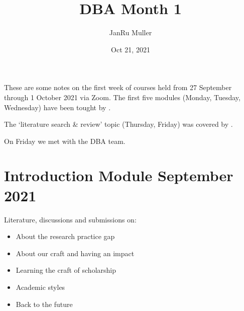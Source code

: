 \documentclass[letterpaper,10pt,english]{jupyterBook}
\title{DBA Month 1}
\date{Oct 21, 2021}
\author{Jan\sphinxhyphen{}Ru Muller}
\begin{document}
\pagestyle{empty}
\sphinxmaketitle
\pagestyle{plain}
\sphinxtableofcontents
\pagestyle{normal}
\label{\detokenize{docs/index::doc}}


\sphinxAtStartPar
These are some notes on the first week of courses held from 27 September through 1 October 2021 via Zoom.
The first five modules (Monday, Tuesday, Wednesday) have been tought by .

\sphinxAtStartPar
The ‘literature search \& review’ topic (Thursday, Friday) was covered by .

\begin{DUlineblock}{0em}
\item[] 
\end{DUlineblock}

\sphinxAtStartPar
On Friday we met with the DBA team.

\begin{figure}[htbp]
\centering

\noindent{}
\end{figure}


\chapter{Introduction Module September 2021}
\label{\detokenize{docs/module1:introduction-module-september-2021}}\label{\detokenize{docs/module1::doc}}
\begin{figure}[htbp]
\centering

\noindent{}
\end{figure}

\sphinxAtStartPar
Literature, discussions and submissions on:
\begin{itemize}
\item {} 
\sphinxAtStartPar
About the research practice gap

\item {} 
\sphinxAtStartPar
About our craft and having an impact

\item {} 
\sphinxAtStartPar
Learning the craft of scholarship

\item {} 
\sphinxAtStartPar
Academic styles

\item {} 
\sphinxAtStartPar
Back to the future

\end{itemize}
\end{document}
